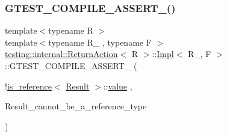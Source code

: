 \subsubsection{\texorpdfstring{GTEST\_COMPILE\_ASSERT\_()}{GTEST\_COMPILE\_ASSERT\_()}\hspace{0.1cm}{\footnotesize\ttfamily [2/3]}}
{\footnotesize\ttfamily template$<$typename R $>$ \\
template$<$typename R\+\_\+ , typename F $>$ \\
\mbox{\hyperlink{classtesting_1_1internal_1_1_return_action}{testing\+::internal\+::\+Return\+Action}}$<$ R $>$\+::\mbox{\hyperlink{classtesting_1_1internal_1_1_return_action_1_1_impl}{Impl}}$<$ R\+\_\+, F $>$\+::G\+T\+E\+S\+T\+\_\+\+C\+O\+M\+P\+I\+L\+E\+\_\+\+A\+S\+S\+E\+R\+T\+\_\+ (\begin{DoxyParamCaption}\item[{!\mbox{\hyperlink{structtesting_1_1internal_1_1is__reference}{is\+\_\+reference}}$<$ \mbox{\hyperlink{classtesting_1_1_action_interface_a7477de2fe3e4e01c59db698203acaee7}{Result}} $>$\+::\mbox{\hyperlink{_obj__test_2lib_2googletest-master_2googlemock_2test_2gmock-matchers__test_8cc_a337b8a670efc0b086ad3af163f3121b6}{value}}}]{,  }\item[{Result\+\_\+cannot\+\_\+be\+\_\+a\+\_\+reference\+\_\+type}]{ }\end{DoxyParamCaption})\hspace{0.3cm}{\ttfamily [private]}}

\mbox{\label{classtesting_1_1internal_1_1_return_action_1_1_impl_aa78abb95d718d193f787e9235818caca}} 
